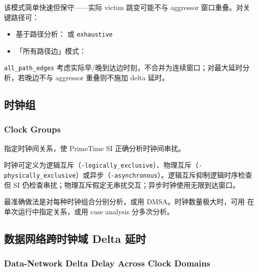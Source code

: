 
该模式简单快速但保守——实际 victim 跳变可能不与 aggressor 窗口重叠。对关键路径可：
\begin{itemize}
  \item 基于路径分析： 或 \texttt{exhaustive}
  \item 「所有路径边」模式：
\end{itemize}



\texttt{all\_path\_edges} 考虑实际早/晚到达边时刻，不合并为连续窗口；对最大延时分析，若晚边不与 aggressor 重叠则不施加 delta 延时。

\subsection{时钟组}
\subsubsection*{Clock Groups}

 指定时钟间关系，使 PrimeTime SI 正确分析时钟间串扰。


时钟可定义为逻辑互斥（\texttt{-logically\_exclusive}）、物理互斥（\texttt{-physically\_exclusive}）或异步（\texttt{-asynchronous}）。逻辑互斥抑制逻辑时序检查但 SI 仍检查串扰；物理互斥假定无串扰交互；异步时钟使用无限到达窗口。

最准确做法是对每种时钟组合分别分析，或用 DMSA。时钟数量极大时，可用  在单次运行中指定关系，或用 case analysis 分多次分析。

\subsection{数据网络跨时钟域 Delta 延时}
\subsubsection*{Data-Network Delta Delay Across Clock Domains}

